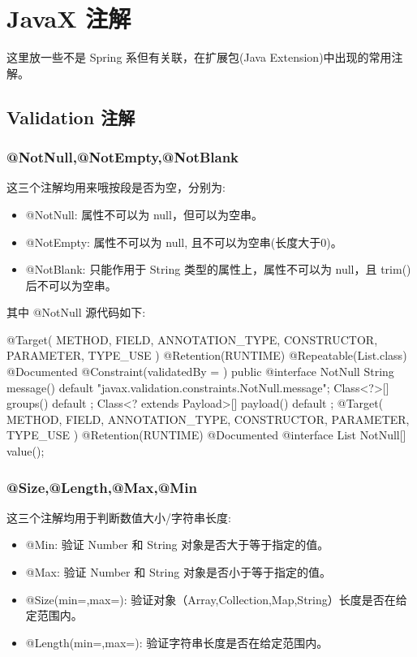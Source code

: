 \section{JavaX 注解}

这里放一些不是 Spring 系但有关联，在扩展包(Java Extension)中出现的常用注解。

\subsection{Validation 注解}

\subsubsection{@NotNull,@NotEmpty,@NotBlank}

这三个注解均用来哦按段是否为空，分别为:
\begin{itemize}
    \item @NotNull: 属性不可以为 null，但可以为空串。
    \item @NotEmpty: 属性不可以为 null, 且不可以为空串(长度大于0)。
    \item @NotBlank: 只能作用于 String 类型的属性上，属性不可以为 null，且 trim() 后不可以为空串。
\end{itemize}

其中 @NotNull 源代码如下:
\begin{Java}
@Target({ METHOD, FIELD, ANNOTATION_TYPE, CONSTRUCTOR, PARAMETER, TYPE_USE })
@Retention(RUNTIME)
@Repeatable(List.class)
@Documented
@Constraint(validatedBy = { })
public @interface NotNull {
    String message() default "{javax.validation.constraints.NotNull.message}";
    Class<?>[] groups() default { };
    Class<? extends Payload>[] payload() default { };
    @Target({ METHOD, FIELD, ANNOTATION_TYPE, CONSTRUCTOR, PARAMETER, TYPE_USE })
    @Retention(RUNTIME)
    @Documented
    @interface List {
        NotNull[] value();
    }
}
\end{Java}

\subsubsection{@Size,@Length,@Max,@Min}

这三个注解均用于判断数值大小/字符串长度:
\begin{itemize}
    \item @Min: 验证 Number 和 String 对象是否大于等于指定的值。
    \item @Max: 验证 Number 和 String 对象是否小于等于指定的值。
    \item @Size(min=,max=): 验证对象（Array,Collection,Map,String）长度是否在给定范围内。
    \item @Length(min=,max=): 验证字符串长度是否在给定范围内。
\end{itemize}

